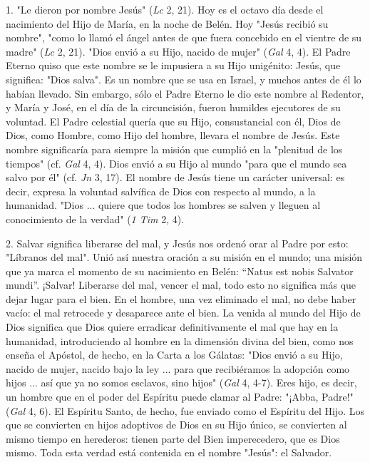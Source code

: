 \begin{body}
1. "Le dieron por nombre Jesús" (\emph{Lc} 2, 21). Hoy es el octavo día
desde el nacimiento del Hijo de María, en la noche de Belén. Hoy "Jesús
recibió su nombre", "como lo llamó el ángel antes de que fuera concebido
en el vientre de su madre" (\emph{Lc} 2, 21). "Dios envió a su Hijo,
nacido de mujer" (\emph{Gal} 4, 4). El Padre Eterno quiso que este
nombre se le impusiera a su Hijo unigénito: Jesús, que significa: "Dios
salva". Es un nombre que se usa en Israel, y muchos antes de él lo
habían llevado. Sin embargo, sólo el Padre Eterno le dio este nombre al
Redentor, y María y José, en el día de la circuncisión, fueron humildes
ejecutores de su voluntad. El Padre celestial quería que su Hijo,
consustancial con él, Dios de Dios, como Hombre, como Hijo del hombre,
llevara el nombre de Jesús. Este nombre significaría para siempre la
misión que cumplió en la "plenitud de los tiempos" (cf. \emph{Gal} 4,
4). Dios envió a su Hijo al mundo "para que el mundo sea salvo por él"
(cf. \emph{Jn} 3, 17). El nombre de Jesús tiene un carácter universal:
es decir, expresa la voluntad salvífica de Dios con respecto al mundo, a
la humanidad. "Dios ... quiere que todos los hombres se salven y lleguen
al conocimiento de la verdad" (\emph{1 Tim} 2, 4).

2. Salvar significa liberarse del mal, y Jesús nos ordenó orar al Padre
por esto: "Líbranos del mal". Unió así nuestra oración a su misión en el
mundo; una misión que ya marca el momento de su nacimiento en Belén:
``Natus est nobis Salvator mundi''. ¡Salvar! Liberarse del mal, vencer
el mal, todo esto no significa más que dejar lugar para el bien. En el
hombre, una vez eliminado el mal, no debe haber vacío: el mal retrocede
y desaparece ante el bien. La venida al mundo del Hijo de Dios significa
que Dios quiere erradicar definitivamente el mal que hay en la
humanidad, introduciendo al hombre en la dimensión divina del bien, como
nos enseña el Apóstol, de hecho, en la Carta a los Gálatas: "Dios envió
a su Hijo, nacido de mujer, nacido bajo la ley ... para que recibiéramos
la adopción como hijos ... así que ya no somos esclavos, sino hijos"
(\emph{Gal} 4, 4-7). Eres hijo, es decir, un hombre que en el poder del
Espíritu puede clamar al Padre: "¡Abba, Padre!" (\emph{Gal} 4, 6). El
Espíritu Santo, de hecho, fue enviado como el Espíritu del Hijo. Los que
se convierten en hijos adoptivos de Dios en su Hijo único, se convierten
al mismo tiempo en herederos: tienen parte del Bien imperecedero, que es
Dios mismo. Toda esta verdad está contenida en el nombre "Jesús": el
Salvador.


\end{body}
